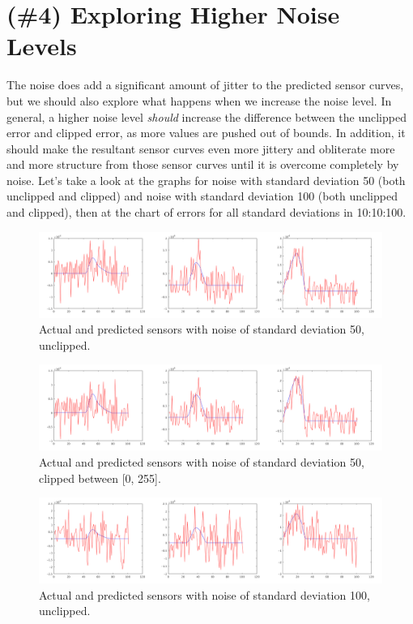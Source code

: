 \documentclass{article}
\begin{document}
\section{(\#4) Exploring Higher Noise Levels}

The noise does add a significant amount of jitter to the predicted sensor 
curves, but we should also explore what happens when we increase the noise 
level. In general, a higher noise level \textit{should} increase the difference 
between the unclipped error and clipped error, as more values are pushed out of 
bounds. In addition, it should make the resultant sensor curves even more jittery 
and obliterate more and more structure from those sensor curves until it is 
overcome completely by noise. Let's take a look at the graphs for noise with 
standard deviation 50 (both unclipped and clipped) and noise with standard 
deviation 100 (both unclipped and clipped), then at the chart 
of errors for all standard deviations in 10:10:100.

\begin{figure}[!ht]
	\centering
	\includegraphics[width=160mm]{figs/sensors_noise_stddev50_unclipped_chanall.png}
	\caption{Actual and predicted sensors with noise of standard deviation 50, unclipped.}
\end{figure}

\begin{figure}[!ht]
	\centering
	\includegraphics[width=160mm]{figs/sensors_noise_stddev50_clipped_chanall.png}
	\caption{Actual and predicted sensors with noise of standard deviation 50, clipped between [0, 255].}
\end{figure}

\begin{figure}[!ht]
	\centering
	\includegraphics[width=160mm]{figs/sensors_noise_stddev100_unclipped_chanall.png}
	\caption{Actual and predicted sensors with noise of standard deviation 100, unclipped.}
\end{figure}
\end{document}
